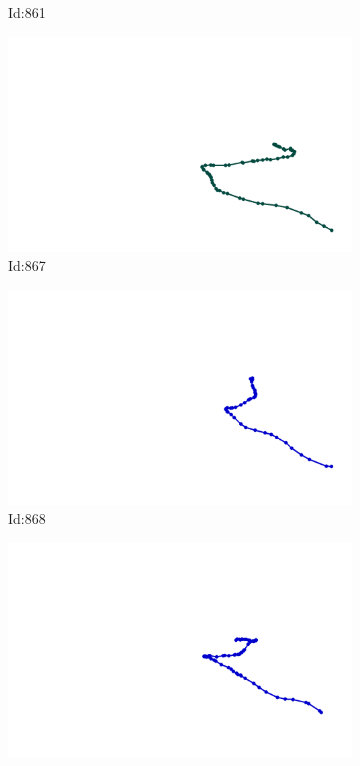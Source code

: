 \documentclass[12pt,twoside]{report}
\begin{document}
\begin{figure}
\begin{subfigure}[b]{0.20\textwidth}
\caption{Id:861}
\end{subfigure}
\begin{subfigure}[b]{0.20\textwidth}
\centering
\includegraphics[width=\textwidth]{../trajectories/867.png}
\caption{Id:867}
\end{subfigure}
\begin{subfigure}[b]{0.20\textwidth}
\centering
\includegraphics[width=\textwidth]{../trajectories/868.png}
\caption{Id:868}
\end{subfigure}
\begin{subfigure}[b]{0.20\textwidth}
\centering
\includegraphics[width=\textwidth]{../trajectories/910.png}

\end{subfigure}
\end{figure}
\end{document}
